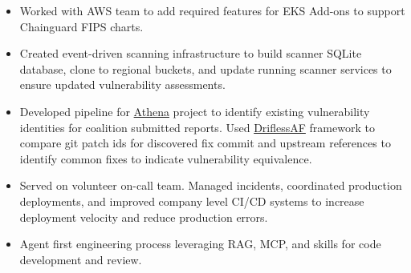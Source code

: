 \begin{itemize}
    \item Worked with AWS team to add required features for EKS Add-ons to support Chainguard FIPS charts.
    \item Created event-driven scanning infrastructure to build scanner SQLite database, clone to regional buckets, and update running scanner services to ensure updated vulnerability assessments.
    \item Developed pipeline for \href{https://www.chainguard.dev/athena}{Athena} project to identify existing vulnerability identities for coalition submitted reports. Used \href{https://github.com/driftlessaf}{DriflessAF} framework to compare git patch ids for discovered fix commit and upstream references to identify common fixes to indicate vulnerability equivalence.
    \item Served on volunteer on-call team. Managed incidents, coordinated production deployments, and improved company level CI/CD systems to increase deployment velocity and reduce production errors.
    \item Agent first engineering process leveraging RAG, MCP, and skills for code development and review.
\end{itemize}